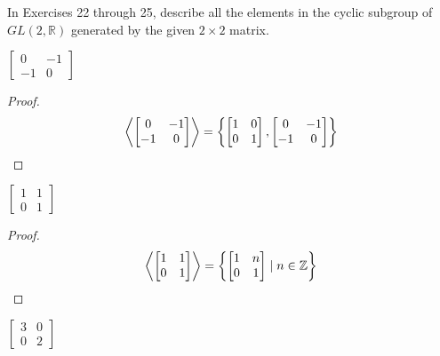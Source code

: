 In Exercises 22 through 25, describe all the elements in the cyclic subgroup of $GL(2, \mathbb{R})$ generated by the given $2\times 2$ matrix.

\begin{exercise}
    $\begin{bmatrix}
            0  & -1 \\
            -1 & 0
        \end{bmatrix}$
\end{exercise}

\begin{proof}
    \[
        \left\langle{\begin{bmatrix}
                0  & -1 \\
                -1 & 0
            \end{bmatrix}}\right\rangle = \left\{
        \begin{bmatrix}
            1 & 0 \\
            0 & 1
        \end{bmatrix},
        \begin{bmatrix}
            0  & -1 \\
            -1 & 0
        \end{bmatrix}
        \right\}
    \]
\end{proof}

\begin{exercise}
    $\begin{bmatrix}
            1 & 1 \\
            0 & 1
        \end{bmatrix}$
\end{exercise}

\begin{proof}
    \[
        \left\langle{\begin{bmatrix}
                1 & 1 \\
                0 & 1
            \end{bmatrix}}\right\rangle = \left\{
        \begin{bmatrix}
            1 & n \\
            0 & 1
        \end{bmatrix} \mid n\in\mathbb{Z}
        \right\}
    \]
\end{proof}

\begin{exercise}
    $\begin{bmatrix}
            3 & 0 \\
            0 & 2
        \end{bmatrix}$
\end{exercise}


